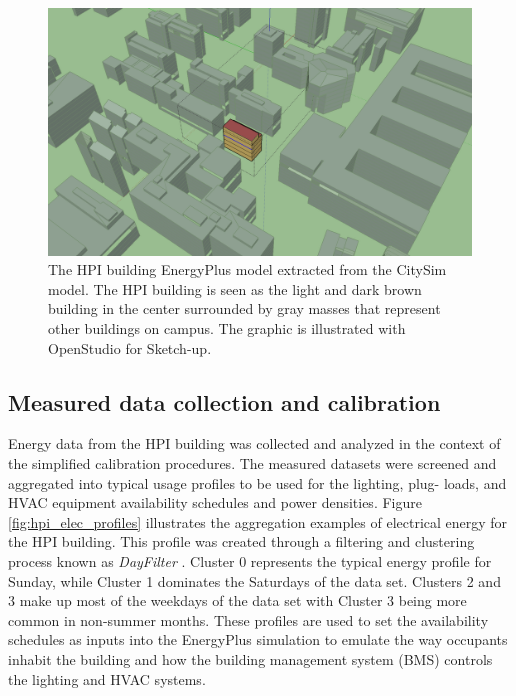 \documentclass{tBPS2e}
\theoremstyle{plain}
\theoremstyle{definition}
\theoremstyle{remark}
\begin{document}
\begin{figure}[H]
\centering
\includegraphics[scale=0.2]{figures/HPI_Campus.png}
\caption{The HPI building EnergyPlus model extracted from the CitySim model. The HPI building is seen
as the light and dark brown building in the center surrounded by gray masses that represent other buildings on 
campus. The graphic is illustrated with OpenStudio for Sketch-up.}
\label{fig:HPIcampus}
\end{figure}

\subsection{Measured data collection and calibration}
Energy data from the HPI building was collected and analyzed in the context of
the simplified calibration procedures. The measured datasets were screened and
aggregated into typical usage profiles to be used for the lighting, plug-
loads, and HVAC equipment availability schedules and power densities. Figure
\ref{fig:hpi_elec_profiles} illustrates the aggregation examples of electrical
energy for the HPI building. This profile was created through a filtering and
clustering process known as \emph{DayFilter} \citep{miller_automated_2015}. Cluster 0 represents
the typical energy profile for Sunday, while Cluster 1 dominates the Saturdays of the data set.
Clusters 2 and 3 make up most of the weekdays of the data set with Cluster 3 being more common in 
non-summer months. These profiles are used to set the availability schedules as inputs into the
EnergyPlus simulation to emulate the way occupants inhabit the building and
how the building management system (BMS) controls the lighting and HVAC
systems. 
\end{document}

